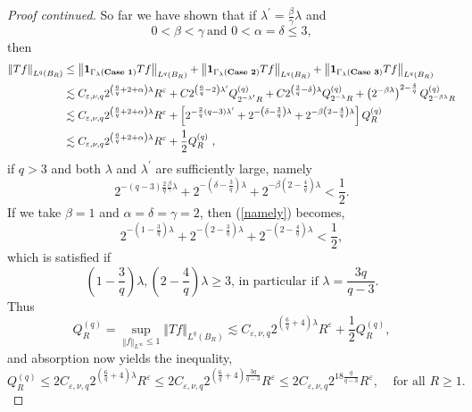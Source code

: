 \documentclass{amsart}%
\theoremstyle{plain}
\numberwithin{equation}{section}
\begin{document}
\begin{proof}
[Proof continued]So far we have shown that if $\lambda^{\prime}=\frac{\beta
}{\gamma}\lambda$ and%
\[
0<\beta<\gamma\ \text{and }0<\alpha=\delta\leq3,
\]
then
\begin{align*}
\left\Vert Tf\right\Vert _{L^{q}\left(  B_{R}\right)  } &  \leq\left\Vert
\mathbf{1}_{\Gamma_{\lambda}\left(  \text{\textbf{Case 1}}\right)
}Tf\right\Vert _{L^{q}\left(  B_{R}\right)  }+\left\Vert \mathbf{1}%
_{\Gamma_{\lambda}\left(  \text{\textbf{Case 2}}\right)  }Tf\right\Vert
_{L^{q}\left(  B_{R}\right)  }+\left\Vert \mathbf{1}_{\Gamma_{\lambda}\left(
\text{\textbf{Case 3}}\right)  }Tf\right\Vert _{L^{q}\left(  B_{R}\right)  }\\
&  \lesssim C_{\varepsilon,\nu,q}2^{\left(  \frac{6}{q}+2+\alpha\right)
\lambda}R^{\varepsilon}+C2^{\left(  \frac{6}{q}-2\right)  \lambda^{\prime}%
}Q_{2^{-\lambda^{\prime}}R}^{\left(  q\right)  }+C2^{\left(  \frac{3}%
{q}-\delta\right)  \lambda}Q_{2^{-\lambda}R}^{\left(  q\right)  }+\left(
2^{-\beta\lambda}\right)  ^{2-\frac{4}{q}}Q_{2^{-\beta\lambda}R}^{\left(
q\right)  }\\
&  \lesssim C_{\varepsilon,\nu,q}2^{\left(  \frac{6}{q}+2+\alpha\right)
\lambda}R^{\varepsilon}+\left[  2^{-\frac{2}{q}\left(  q-3\right)
\lambda^{\prime}}+2^{-\left(  \delta-\frac{3}{q}\right)  \lambda}%
+2^{-\beta\left(  2-\frac{4}{q}\right)  \lambda}\right]  Q_{R}^{\left(
q\right)  }\\
&  \lesssim C_{\varepsilon,\nu,q}2^{\left(  \frac{6}{q}+2+\alpha\right)
\lambda}R^{\varepsilon}+\frac{1}{2}Q_{R}^{\left(  q\right)  }\ ,
\end{align*}
if $q>3$ and both $\lambda$ and $\lambda^{\prime}$ are sufficiently large,
namely%
\begin{equation}
2^{-\left(  q-3\right)  \frac{2}{q}\frac{\beta}{\gamma}\lambda}+2^{-\left(
\delta-\frac{3}{q}\right)  \lambda}+2^{-\beta\left(  2-\frac{4}{q}\right)
\lambda}<\frac{1}{2}.\label{namely}%
\end{equation}
If we take $\beta=1$ and $\alpha=\delta=\gamma=2$, then (\ref{namely})
becomes,%
\[
2^{-\left(  1-\frac{3}{q}\right)  \lambda}+2^{-\left(  2-\frac{3}{q}\right)
\lambda}+2^{-\left(  2-\frac{4}{q}\right)  \lambda}<\frac{1}{2},
\]
which is satisfied if
\[
\left(  1-\frac{3}{q}\right)  \lambda,\left(  2-\frac{4}{q}\right)
\lambda\geq3\text{, in particular if }\lambda=\frac{3q}{q-3}.
\]
Thus
\[
Q_{R}^{\left(  q\right)  }=\sup_{\left\Vert f\right\Vert _{L^{\infty}}\leq
1}\left\Vert Tf\right\Vert _{L^{q}\left(  B_{R}\right)  }\lesssim
C_{\varepsilon,\nu,q}2^{\left(  \frac{6}{q}+4\right)  \lambda}R^{\varepsilon
}+\frac{1}{2}Q_{R}^{\left(  q\right)  },
\]
and absorption now yields the inequality,%
\[
Q_{R}^{\left(  q\right)  }\leq2C_{\varepsilon,\nu,q}2^{\left(  \frac{6}%
{q}+4\right)  \lambda}R^{\varepsilon}\leq2C_{\varepsilon,\nu,q}2^{\left(
\frac{6}{q}+4\right)  \frac{3q}{q-3}}R^{\varepsilon}\leq2C_{\varepsilon,\nu
,q}2^{18\frac{q}{q-3}}R^{\varepsilon},\ \ \ \ \ \text{for all }R\geq1.
\]



\end{proof}
\end{document}
